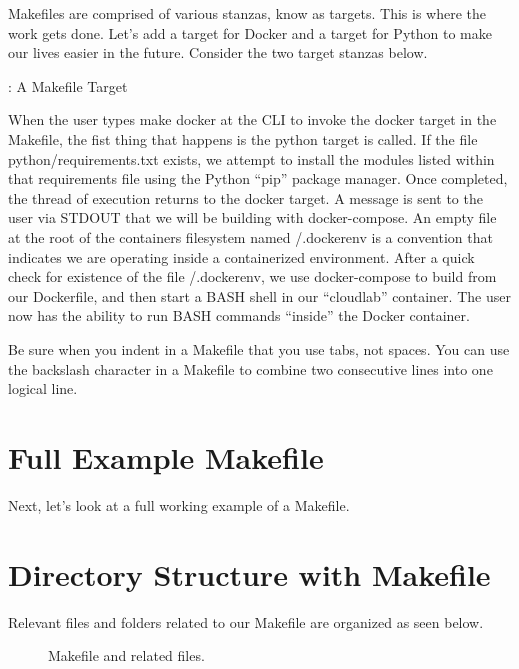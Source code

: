 \justify{}
Makefiles are comprised of various stanzas, know as targets. This is
where the work gets done. Let's add a target for Docker and a target for
Python to make our lives easier in the future. Consider the two target
stanzas below.

\justify{}
\begin{mybox}{\thetcbcounter: A Makefile Target}
	
\end{mybox}

\justify{}
When the user types make docker at the CLI to invoke the docker target
in the Makefile, the fist thing that happens is the python target is
called. If the file python/requirements.txt exists, we attempt to
install the modules listed within that requirements file using the
Python ``pip'' package manager. Once completed, the thread of execution
returns to the docker target. A message is sent to the user via STDOUT
that we will be building with docker-compose. An empty file at the root
of the containers filesystem named /.dockerenv is a convention that
indicates we are operating inside a containerized environment. After a
quick check for existence of the file /.dockerenv, we use docker-compose
to build from our Dockerfile, and then start a BASH shell in our
``cloudlab'' container. The user now has the ability to run BASH commands
``inside'' the Docker container.

\justify{}
Be sure when you indent in a Makefile that you use tabs, not spaces. You
can use the backslash character in a Makefile to combine two consecutive
lines into one logical line.

\section{Full Example Makefile}
\justify{}
Next, let's look at a full working example of a Makefile.

\section{Directory Structure with Makefile}
\justify{}
Relevant files and folders related to our Makefile are organized as seen
below.

\begin{figure}[!htb]
	
	\caption{Makefile and related files.}
\label{makefile}
\end{figure}

